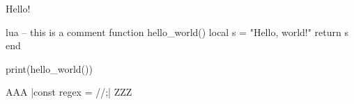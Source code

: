 \documentclass{article}
\begin{document}
Hello!

\begin{syntax}{lua}
-- this is a comment
function hello_world()
    local s = "Hello, world!"
    return s
end

print(hello_world())
\end{syntax}

AAA |const regex = /\s*/;| ZZZ
\end{document}
